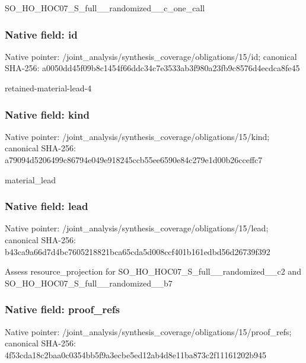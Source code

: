 \documentclass[10pt,a4paper]{article}
\begin{document}
\begingroup\raggedright\sloppy SO\_\allowbreak{}HO\_\allowbreak{}HOC07\_\allowbreak{}S\_\allowbreak{}full\_\allowbreak{}\_\allowbreak{}randomized\_\allowbreak{}\_\allowbreak{}c\_\allowbreak{}one\_\allowbreak{}call\par\endgroup

\subsubsection{Native field: id}
Native pointer: /joint\_\allowbreak{}analysis/synthesis\_\allowbreak{}coverage/obligations/15/id; canonical SHA-256: a0050dd45f09b8c1454f66ddc34c7e3533ab3f980a23fb9c8576d4ecdca8fe45

\begingroup\raggedright\sloppy retained-material-lead-4\par\endgroup

\subsubsection{Native field: kind}
Native pointer: /joint\_\allowbreak{}analysis/synthesis\_\allowbreak{}coverage/obligations/15/kind; canonical SHA-256: a79094d5206499c86794e049e918245ccb55ee6590e84c279e1d00b26cceffc7

\begingroup\raggedright\sloppy material\_\allowbreak{}lead\par\endgroup

\subsubsection{Native field: lead}
Native pointer: /joint\_\allowbreak{}analysis/synthesis\_\allowbreak{}coverage/obligations/15/lead; canonical SHA-256: b43ca9a66d7d4bc7605218821bca65cda5d008ccf401b161edbd56d26739f392

\begingroup\raggedright\sloppy Assess resource\_\allowbreak{}projection for SO\_\allowbreak{}HO\_\allowbreak{}HOC07\_\allowbreak{}S\_\allowbreak{}full\_\allowbreak{}\_\allowbreak{}randomized\_\allowbreak{}\_\allowbreak{}c2 and SO\_\allowbreak{}HO\_\allowbreak{}HOC07\_\allowbreak{}S\_\allowbreak{}full\_\allowbreak{}\_\allowbreak{}randomized\_\allowbreak{}\_\allowbreak{}b7\par\endgroup

\subsubsection{Native field: proof\_\allowbreak{}refs}
Native pointer: /joint\_\allowbreak{}analysis/synthesis\_\allowbreak{}coverage/obligations/15/proof\_\allowbreak{}refs; canonical SHA-256: 4f53cda18c2baa0c0354bb5f9a3ecbe5ed12ab4d8e11ba873c2f11161202b945
\end{document}
